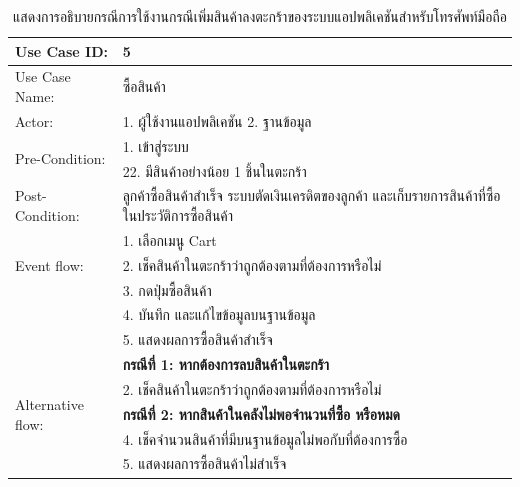 \begin{table}[htbp]
  \centering
  \caption{แสดงการอธิบายกรณีการใช้งานกรณีเพิ่มสินค้าลงตะกร้าของระบบแอปพลิเคชันสำหรับโทรศัพท์มือถือ}
  \label{tab:example}
  \begin{tabularx}{\textwidth}{|p{3cm}|X|}
      \hline
      \multirow{1}{3cm}{Use Case ID:} & 5 \\
      \hline
      \multirow{1}{3cm}{Use Case Name:} & ซื้อสินค้า \\
      \hline
      \multirow{1}{3cm}{Actor:} & 1. ผู้ใช้งานแอปพลิเคชัน 2. ฐานข้อมูล \\
      \hline
      \multirow{2}{3cm}{Pre-Condition:} & 1. เข้าสู่ระบบ \\ & 22. มีสินค้าอย่างน้อย 1 ชิ้นในตะกร้า \\
      \hline
      \multirow{1}{3cm}{Post-Condition:} & ลูกค้าซื้อสินค้าสำเร็จ ระบบตัดเงินเครดิตของลูกค้า และเก็บรายการสินค้าที่ซื้อในประวัติการซื้อสินค้า \\
      \hline
      \multirow{3}{3cm}{Event flow:} & 1. เลือกเมนู Cart \\ 
      & 2. เช็คสินค้าในตะกร้าว่าถูกต้องตามที่ต้องการหรือไม่ \\ & 3. กดปุ่มซื้อสินค้า \\
      & 4. บันทึก และแก้ไขข้อมูลบนฐานข้อมูล \\ & 5. แสดงผลการซื้อสินค้าสำเร็จ \\
      \hline
      \multirow{5}{3cm}{Alternative flow:} & \textbf{กรณีที่ 1: หากต้องการลบสินค้าในตะกร้า} \\ 
      & 2. เช็คสินค้าในตะกร้าว่าถูกต้องตามที่ต้องการหรือไม่ \\ & \textbf{กรณีที่ 2: หากสินค้าในคลังไม่พอจำนวนที่ซื้อ หรือหมด} \\
      & 4. เช็คจำนวนสินค้าที่มีบนฐานข้อมูลไม่พอกับที่ต้องการซื้อ \\ & 5. แสดงผลการซื้อสินค้าไม่สำเร็จ \\
      \hline
  \end{tabularx}
\end{table}


